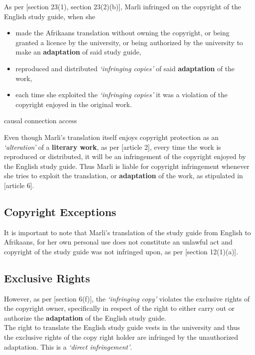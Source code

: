 \documentclass[11pt]{article}
\begin{document}
As per [section 23(1), section 23(2)(b)]\cite{rsa78_copyrightact}, Marli
infringed on the copyright of the English study guide, when she
\begin{itemize}
\item made the Afrikaans translation without owning the copyright, or
being granted a licence by the university, or being authorized by
the university to make an \textbf{adaptation} of said study guide,
\item reproduced and distributed \emph{`infringing copies'} of said \textbf{adaptation} of
the work,
\item each time she exploited the \emph{`infringing copies'} it was a violation
of the copyright enjoyed in the original work.
\end{itemize}

causal connection \cite{burger85_bosal_afrika_v_grapnel} access
\cite{corbett89_galago_v_erasmus}

Even though Marli's translation itself enjoys copyright protection as
an \emph{`alteration'} of a \textbf{literary work}, as per [article
2]\cite{wipo86_berne}, every time the work is reproduced or distributed,
it will be an infringement of the copyright enjoyed by the English
study guide. Thus Marli is liable for copyright infringement whenever
she tries to exploit the translation, or \textbf{adaptation} of the work, as
stipulated in [article 6]\cite{wto17_trips}.

\subsection{Copyright Exceptions}
\label{sec:orgdf70414}
It is important to note that Marli's translation of the study guide
from English to Afrikaans, for her own personal use does not
constitute an unlawful act and copyright of the study guide was not
infringed upon, as per [section 12(1)(a)]\cite{rsa78_copyrightact}.
\subsection{Exclusive Rights}
\label{sec:org2e9b2ca}
However, as per [section 6(f)]\cite{rsa78_copyrightact}, the
\emph{`infringing copy'} violates the exclusive rights of the copyright
owner, specifically in respect of the right to either carry out or
authorize the \textbf{adaptation} of the English study guide.\\

The right to translate the English study guide vests in the
university and thus the exclusive rights of the copy right holder are
infringed by the unauthorized adaptation. This is a \emph{`direct infringement'}.\\
\end{document}
